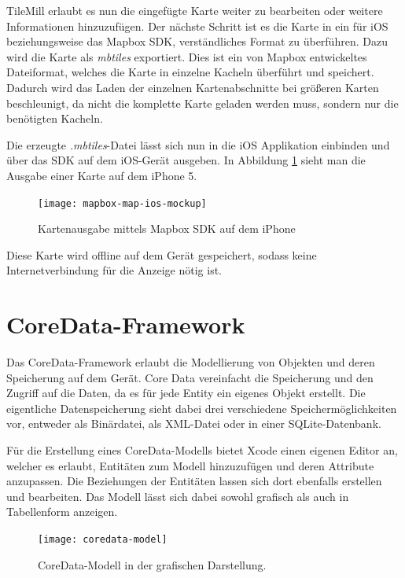 TileMill erlaubt es nun die eingefügte Karte weiter zu bearbeiten oder weitere Informationen hinzuzufügen.
Der nächste Schritt ist es die Karte in ein für iOS beziehungsweise das Mapbox SDK, verständliches Format zu überführen.
Dazu wird die Karte als \emph{mbtiles} exportiert. Dies ist ein von Mapbox entwickeltes Dateiformat, welches die Karte in einzelne Kacheln überführt und speichert. Dadurch wird das Laden der einzelnen Kartenabschnitte bei größeren Karten beschleunigt, da nicht die komplette Karte geladen werden muss, sondern nur die benötigten Kacheln.

Die erzeugte \emph{.mbtiles}-Datei lässt sich nun in die iOS Applikation einbinden und über das SDK auf dem iOS-Gerät ausgeben. In Abbildung \ref{mapbox-map-ios} sieht man die Ausgabe einer Karte auf dem iPhone 5.

\begin{figure}[htb!]
		\centering
	\texttt{[image: mapbox-map-ios-mockup]}
	\caption{Kartenausgabe mittels Mapbox SDK auf dem iPhone}
	\label{mapbox-map-ios}
\end{figure}

Diese Karte wird offline auf dem Gerät gespeichert, sodass keine Internetverbindung für die Anzeige nötig ist.

\section{CoreData-Framework}
\label{sec:technologies:coredata}
Das CoreData-Framework erlaubt die Modellierung von Objekten und deren Speicherung auf dem Gerät.
Core Data vereinfacht die Speicherung und den Zugriff auf die Daten, da es für jede Entity ein eigenes Objekt erstellt.
Die eigentliche Datenspeicherung sieht dabei drei verschiedene Speichermöglichkeiten vor, entweder als Binärdatei, als XML-Datei oder in einer SQLite-Datenbank. 

Für die Erstellung eines CoreData-Modells bietet Xcode einen eigenen Editor an, welcher es erlaubt, Entitäten zum Modell hinzuzufügen und deren Attribute anzupassen. Die Beziehungen der Entitäten lassen sich dort ebenfalls erstellen und bearbeiten. Das Modell lässt sich dabei sowohl grafisch als auch in Tabellenform anzeigen.

\begin{figure}[htb!]
		\centering
	\texttt{[image: coredata-model]}
	\caption{CoreData-Modell in der grafischen Darstellung.}
	\label{coredata-model}
\end{figure}


